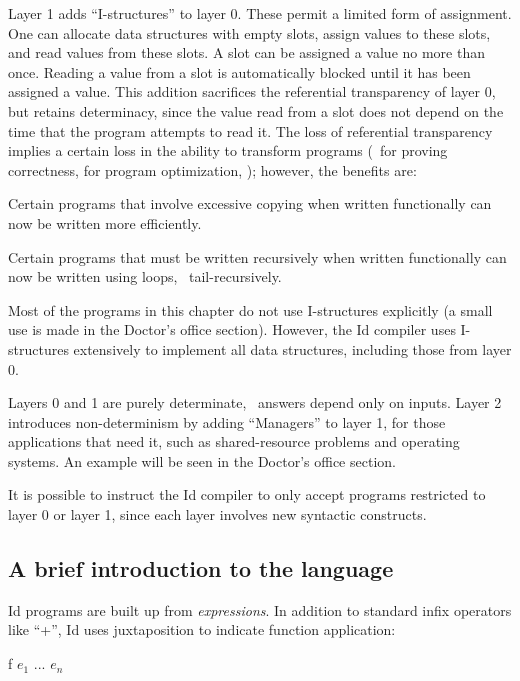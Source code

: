 Layer 1 adds ``I-structures'' to layer 0. These permit a limited form
of assignment.  One can allocate data structures with empty slots,
assign values to these slots, and read values from these slots.  A
slot can be assigned a value no more than once.  Reading a value from
a slot is automatically blocked until it has been assigned a value.
This addition sacrifices the referential transparency of layer 0, but retains
determinacy, since the value read from a slot does not depend on the time
that the program attempts to read it.  The loss of referential transparency
implies a certain loss in the ability to transform programs (\eg\ for proving
correctness, for program optimization, \etc); however, the benefits are:
 \begin{tightlist}

    \item Certain programs that involve excessive copying when written
    functionally can now be written more efficiently.

    \item Certain programs that must be written recursively when written
    functionally can now be written using loops, \ie\ tail-recursively.

 \end{tightlist}
Most of the programs in this chapter do not use I-structures
explicitly (a small use is made in the Doctor's office section).
However, the Id compiler uses I-structures extensively to implement
all data structures, including those from layer 0.

Layers 0 and 1 are purely determinate, \ie\ answers depend only on
inputs.  Layer 2 introduces non-determinism by adding ``Managers'' to
layer 1, for those applications that need it, such as shared-resource
problems and operating systems.  An example will be seen in the
Doctor's office section.

It is possible to instruct the Id compiler to only accept programs
restricted to layer 0 or layer 1, since each layer involves new
syntactic constructs.

\subsection{A brief introduction to the language}

Id programs are built up from {\em expressions\/}.  In addition to
standard infix operators like ``{\cf +}'', Id uses juxtaposition to
indicate function application:

\beginid
f $e_1$ ... $e_n$
\endid

